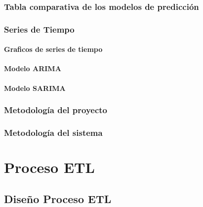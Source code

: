 \documentclass[letterpaper, 12pt]{report}
\begin{document}
\subsection{Tabla comparativa de los modelos de predicción}


\subsection{Series de Tiempo}
\subsubsection{Graficos de series de tiempo}

\subsubsection{Modelo ARIMA}

\subsubsection{Modelo SARIMA}


\subsection{Metodología del proyecto}


\subsection{Metodología del sistema}


\chapter{Proceso ETL}


\section{Diseño Proceso ETL}

\end{document}
